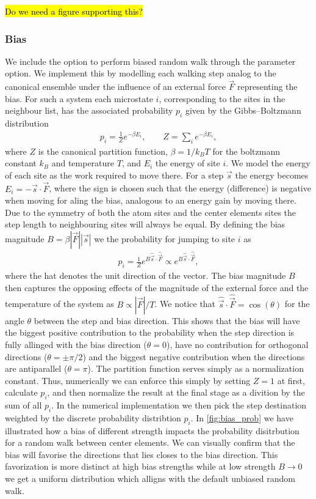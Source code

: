 \hl{Do we need a figure supporting this?}

\subsubsection{Bias} %
We include the option to perform biased random walk through the  parameter option. We implement this by modelling each
walking step analog to the canonical ensemble under the influence of an
external force $\vec{F}$ representing the bias. For such a system each
microstate $i$, corresponding to the sites in the neighbour list, has the
associated probability $p_i$ given by the Gibbs–Boltzmann distribution
\begin{align*}
  p_{i} = \frac{1}{Z}e^{-\beta E_i}, \qquad Z = \sum_i e^{-\beta E_i},
\end{align*}
where $Z$ is the canonical partition function, $\beta = 1/k_B T$ for the
boltzmann constant $k_B$ and temperature $T$, and $E_i$ the energy of site $i$.
We model the energy of each site as the work required to move there. For a step
$\vec{s}$ the energy becomes $E_i = -\vec{s}\cdot\vec{F}$, where the sign is chosen such that the energy (difference) is negative when moving for aling the bias, analogous to an energy gain by
moving there. Due to the symmetry of both the atom sites and the center elements
sites the step length to neighbouring sites will always be equal. By defining
the bias magnitude $B = \beta|\vec{F}||\vec{s}|$ we the probability for
jumping to site $i$ as
\begin{align*}
  p_i = \frac{1}{Z}e^{B\hat{\vec{s}}\cdot\hat{\vec{F}}} \propto e^{B\hat{\vec{s}}\cdot\hat{\vec{F}}},
\end{align*}
 where the hat denotes the unit direction of the vector. The bias magnitude $B$ then captures the opposing effects of the magnitude of the external force and the
 temperature of the system as $B\propto |\vec{F}|/T$. We notice that
 $\hat{\vec{s}}\cdot\hat{\vec{F}} = \cos{(\theta)}$ for the angle $\theta$
 between the step and bias direction. This shows that the bias will have the
 biggest positive contribution to the probability when the step direction is fully allinged with the bias
 direction ($\theta = 0$), have no contribution for orthogonal directions
 ($\theta = \pm \pi/2$) and the biggest negative contribution when the directions
 are antiparallel ($\theta = \pi$). The partition function serves simply as a
 normalization constant. Thus, numerically we can enforce this simply by setting $Z = 1$ at first, calculate $p_i$, and then normalize the result at the final stage as a
 divition by the sum of all $p_i$. In the numerical implementation we then pick
 the step destination weighted by the discrete probability distribtion $p_i$. In
 \cref{fig:bias_prob} we have illustrated how a bias of different strength impacts the probability disitrbution for a random walk between center elements. We can visually confirm that the bias will favorise the directions that lies closes to the bias direction. This favorization is more distinct at high bias strengths while at low strength $B\to0$ we get a uniform distribution which alligns with the default unbiased random walk. 

